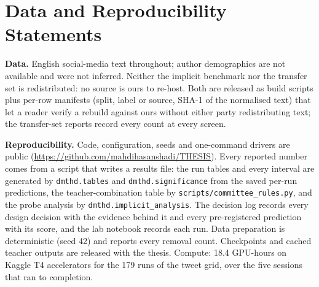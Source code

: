 \chapter{Data and Reproducibility Statements}
\label{app:statements}
\textbf{Data.} English social-media text throughout; author demographics are not available and were
not inferred. Neither the implicit benchmark nor the transfer set is redistributed: no source is
ours to re-host. Both are released as build scripts plus per-row manifests (split, label or source,
SHA-1 of the normalised text) that let a reader verify a rebuild against ours without either party
redistributing text; the transfer-set reports record every count at every screen.

\textbf{Reproducibility.} Code, configuration, seeds and one-command drivers are public
(\url{https://github.com/mahdihasanshadi/THESIS}). Every reported number comes from a script that
writes a results file: the run tables and every interval are generated by \texttt{dmthd.tables} and
\texttt{dmthd.significance} from the saved per-run predictions, the teacher-combination table by
\texttt{scripts/committee\_rules.py}, and the probe analysis by \texttt{dmthd.implicit\_analysis}.
The decision log records every design decision with the evidence behind it and every pre-registered
prediction with its score, and the lab notebook records each run. Data preparation is deterministic
(seed 42) and reports every removal count. Checkpoints and cached teacher outputs are released with
the thesis. Compute: 18.4 GPU-hours on Kaggle T4 accelerators for the 179 runs of the tweet grid,
over the five sessions that ran to completion.
